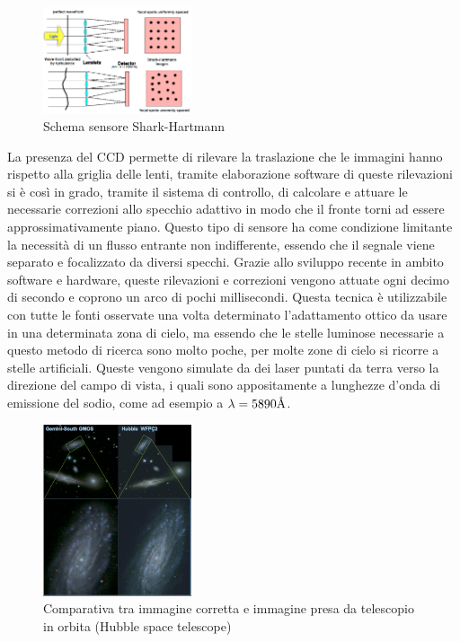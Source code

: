 \begin{figure}
	\centering
	\includegraphics[width=0.39\textwidth]{Immagini/Capitolo2/sensore_Shark_Hartmann.PNG}
	\caption{Schema sensore Shark-Hartmann}
	\label{im:sensore-Shack-Hartmann}
	\vspace{-10pt}
\end{figure}

La presenza del CCD permette di rilevare la traslazione che le immagini hanno rispetto alla griglia delle lenti, tramite elaborazione software di queste rilevazioni si è così in grado, tramite il sistema di controllo, di calcolare e attuare le necessarie correzioni allo specchio adattivo in modo che il fronte torni ad essere approssimativamente piano. Questo tipo di sensore ha come condizione limitante la necessità di un flusso entrante non indifferente, essendo che il segnale viene separato e focalizzato da diversi specchi. Grazie allo sviluppo recente in ambito software e hardware, queste rilevazioni e correzioni vengono attuate ogni decimo di secondo e coprono un arco di pochi millisecondi. Questa tecnica è utilizzabile con tutte le fonti osservate una volta determinato l'adattamento ottico da usare in una determinata zona di cielo, ma essendo che le stelle luminose necessarie a questo metodo di ricerca sono molto poche, per molte zone di cielo si ricorre a stelle artificiali. Queste vengono simulate da dei laser puntati da terra verso la direzione del campo di vista, i quali sono appositamente a lunghezze d'onda di emissione del sodio, come ad esempio a $\lambda=5890\mbox{\normalfont\AA}$.

\begin{figure}
    \centering
    \vspace{-10pt}
    \includegraphics[width=0.39\textwidth]{Immagini/Capitolo2/Seeing_vs_Hubble.PNG}
    \caption{Comparativa tra immagine corretta e immagine presa da telescopio in orbita (Hubble space telescope)}
    \label{im:seeingvsHubble}
    \vspace{-10pt}
\end{figure}
 
